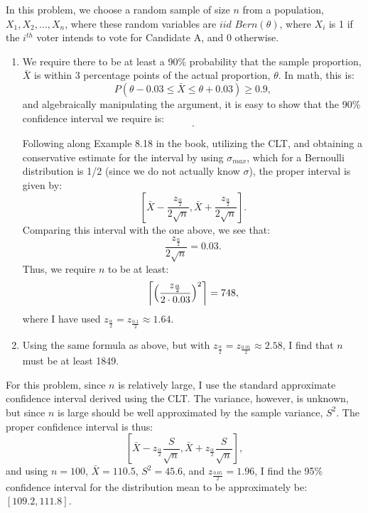 \begin{problem}{12}  In this problem, we choose a random sample of size $n$ from a population, $X_1, X_2, \ldots, X_n$, where these random variables are $iid$ $Bern(\theta)$, where $X_i$ is 1 if the $i^{th}$ voter intends to vote for Candidate A, and 0 otherwise.
\begin{enumerate}

\item We require there to be at least a 90\% probability that the sample proportion, $\bar X$ is within 3 percentage points of the actual proportion, $\theta$.  In math, this is:
\begin{equation*}
P( \theta -0.03 \le \bar X \le \theta+0.03) \ge 0.9,
\end{equation*}
and algebraically manipulating the argument, it is easy to show that the 90\% confidence interval we require is:
\begin{equation*}
[\bar X -0.03, \bar X+0.03].
\end{equation*}

Following along Example 8.18 in the book, utilizing the CLT, and obtaining a conservative estimate for the interval by using $\sigma_{max}$, which for a Bernoulli distribution is 1/2 (since we do not actually know $\sigma$), the proper interval is given by:
\begin{equation*}
\left [\bar X -\frac{z_{\frac{\alpha}{2}}}{2 \sqrt{n}}, \bar X +\frac{z_{\frac{\alpha}{2}}}{2 \sqrt{n}}\right].
\end{equation*}
Comparing this interval with the one above, we see that:
\begin{equation*}
\frac{z_{\frac{\alpha}{2}}}{2 \sqrt{n}} = 0.03.
\end{equation*}
Thus, we require $n$ to be at least:
\begin{equation*}
\ceil*{\left( \frac{z_{\frac{\alpha}{2}}}{2 \cdot 0.03}\right)^2} = 748,
\end{equation*}
where I have used $z_{\frac{\alpha}{2}} =z_{\frac{0.1}{2}} \approx 1.64$.

\item Using the same formula as above, but with $z_{\frac{\alpha}{2}} =z_{\frac{0.01}{2}} \approx 2.58$, I find that $n$ must be at least 1849.

\end{enumerate}

\end{problem}

\begin{problem}{13} For this problem, since $n$ is relatively large, I use the standard approximate confidence interval derived using the CLT.  The variance, however, is unknown, but since $n$ is large should be well approximated by the sample variance, $S^2$.  The proper confidence interval is thus:
\begin{equation*}
\left [\bar X -z_{\frac{\alpha}{2}}\frac{S}{\sqrt{n}}, \bar X +z_{\frac{\alpha}{2}}\frac{S}{\sqrt{n}} \right],
\end{equation*}
and using $n=100$, $\bar X = 110.5$, $S^2 = 45.6$, and $z_{\frac{0.05}{2}} = 1.96$, I find the 95\% confidence interval for the distribution mean to be approximately be: $[109.2, 111.8]$.
\end{problem}


